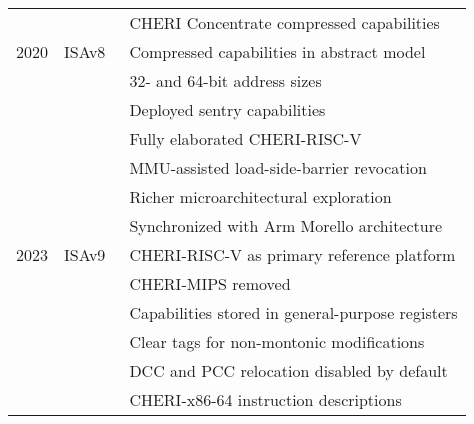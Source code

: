 \begin{tabular}{llp{3.25in}}
  & & CHERI Concentrate compressed capabilities \smallskip \\
  2020 & ISAv8~\cite{UCAM-CL-TR-951} & Compressed capabilities in abstract
  model \\
  & & 32- and 64-bit address sizes \\
  & & Deployed sentry capabilities \\
  & & Fully elaborated CHERI-RISC-V \\
  & & MMU-assisted load-side-barrier revocation \\
  & & Richer microarchitectural exploration \\
  & & Synchronized with Arm Morello architecture~\cite{arm-morello} \\
  2023 & ISAv9~\cite{UCAM-CL-TR-987} & CHERI-RISC-V as primary
  reference platform \\
  & & CHERI-MIPS removed \\
  & & Capabilities stored in general-purpose registers \\
  & & Clear tags for non-montonic modifications \\
  & & DCC and PCC relocation disabled by default \\
  & & CHERI-x86-64 instruction descriptions \\
\bottomrule
\end{tabular}
